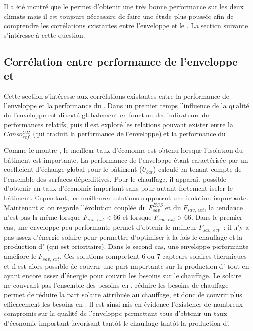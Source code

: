 Il a été montré que le  permet d’obtenir une très bonne performance sur les deux
climats mais il est toujours nécessaire de faire une étude plus poussée afin de comprendre
les corrélations existantes entre l’enveloppe et le . La section suivante
s’intéresse à cette question.



\subsection{Corrélation entre performance de l’enveloppe et } %
\label{sub:correlation_entre_performance_de_l_enveloppe_et_ssc}
Cette section s’intéresse aux corrélations existantes entre la performance de l’enveloppe
et la performance du . Dans un premier temps l’influence de la qualité de
l’enveloppe est discuté globalement en fonction des indicateurs de performances relatifs,
puis il est exploré les relations pouvant exister entre la $Conso_{ref}^{CH}$ (qui traduit
la performance de l’enveloppe) et la performance du .

Comme le montre , le meilleur taux d’économie est
obtenu lorsque l’isolation du bâtiment est importante. La performance de l’enveloppe
étant caractérisée par un coefficient d’échange global pour le bâtiment ($U_{bat}$) calculé
en tenant compte de l’ensemble des surfaces déperditives. Pour le chauffage, il apparaît
possible d’obtenir un taux d’économie important sans pour autant fortement isoler le
bâtiment. Cependant, les meilleures solutions supposent une isolation importante.
Maintenant si on regarde l’évolution couplée du $F_{sav}^{ECS}$ et du $F_{sav,\, ext}$, la
tendance n’est pas la même lorsque $F_{sav,\, ext} < 66$ et lorsque $F_{sav,\, ext} > 66$.
Dans le premier cas, une enveloppe peu performante permet d’obtenir le meilleur $F_{sav,\,ext}$~:
il n’y a pas assez d’énergie solaire pour permettre d’optimiser à la fois le
chauffage et la production d’ (qui est prioritaire). Dans le second cas, une
enveloppe performante améliore le $F_{sav,\, ext}$. Ces solutions comportent $6$ ou $7$
capteurs solaires thermiques et il est alors possible de couvrir une part importante sur
la production d’ tout en ayant encore assez d’énergie pour couvrir les besoins sur
le chauffage. Le solaire ne couvrant pas l’ensemble des besoins en
, réduire les besoins de chauffage permet de réduire la part solaire attribuée au
chauffage, et donc de couvrir plus efficacement les besoins en .
Il est ainsi mis en évidence l’existence de nombreux compromis sur la qualité de l’enveloppe
permettant tous d’obtenir un taux d’économie important favorisant tantôt le chauffage
tantôt la production d’.

